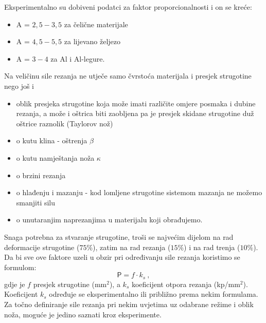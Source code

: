 \documentclass[a4paper,12pt]{article}
\numberwithin{figure}{section}
\begin{document}
Eksperimentalno su dobiveni podatci za faktor proporcionalnosti i on se kreće:
\begin{itemize}
\item A = $2,5 - 3,5$ za čelične materijale
\item A = $4,5 - 5,5$ za lijevano željezo
\item A = $3 - 4$ za Al i Al-legure.
\end{itemize} 
Na veličinu sile rezanja ne utječe samo čvrstoća materijala i presjek strugotine nego još i
\begin{itemize}
\item oblik presjeka strugotine koja može imati različite omjere posmaka i dubine rezanja, a može i oštrica biti zaobljena pa je presjek skidane strugotine duž oštrice raznolik (Taylorov nož)
\item o kutu klina - oštrenja $\beta$
\item o kutu namještanja noža $\kappa$
\item o brzini rezanja
\item o hlađenju i mazanju - kod lomljene strugotine sistemom mazanja ne možemo smanjiti silu
\item o unutaranjim naprezanjima u materijalu koji obrađujemo.
\end{itemize} 
Snaga potrebna za stvaranje strugotine, troši se najvećim dijelom na rad deformacije strugotine ($75\%$), zatim na rad rezanja ($15\%$) i na rad trenja ($10\%$).
Da bi sve ove faktore uzeli u obzir pri određivanju sile rezanja koristimo se formulom:
\begin{equation*}
\mathsf{P} = f \cdot k_{s}\:,
\end{equation*}
gdje je $f$ presjek strugotine (mm$^{2}$), a $k_{s}$ koeficijent otpora rezanja (kp/mm$^{2}$). Koeficijent $k_{s}$ određuje se eksperimentalno ili približno prema nekim formulama.
Za točno definiranje sile rezanja pri nekim uvjetima uz odabrane režime i oblik noža, moguće je jedino saznati kroz eksperimente.
\end{document}
